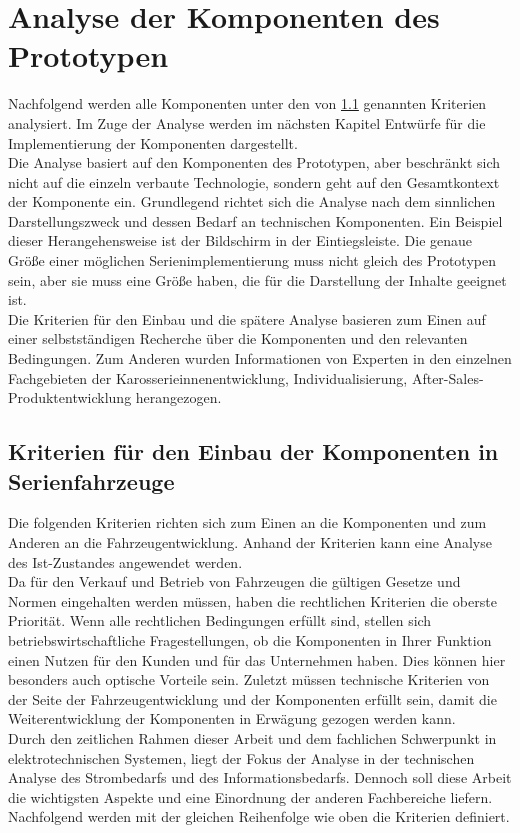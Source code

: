 \chapter{Analyse der Komponenten des Prototypen}
\label{cha:Analyse}
Nachfolgend werden alle Komponenten unter den von \ref{cha:Kriterien} genannten Kriterien analysiert. Im Zuge der Analyse werden im nächsten Kapitel Entwürfe für die Implementierung der Komponenten dargestellt.\\
Die Analyse basiert auf den Komponenten des Prototypen, aber beschränkt sich nicht auf die einzeln verbaute Technologie, sondern geht auf den Gesamtkontext der Komponente ein. Grundlegend richtet sich die Analyse nach dem sinnlichen Darstellungszweck und dessen Bedarf an technischen Komponenten. Ein Beispiel dieser Herangehensweise ist der Bildschirm in der Eintiegsleiste. Die genaue Größe einer möglichen Serienimplementierung muss nicht gleich des Prototypen sein, aber sie muss eine Größe haben, die für die Darstellung der Inhalte geeignet ist.\\
Die Kriterien für den Einbau und die spätere Analyse basieren zum Einen auf einer selbstständigen Recherche über die Komponenten und den relevanten Bedingungen. Zum Anderen wurden Informationen von Experten in den einzelnen Fachgebieten der Karosserieinnenentwicklung, Individualisierung, After-Sales-Produktentwicklung herangezogen.
\section{Kriterien für den Einbau der Komponenten in Serienfahrzeuge}
\label{cha:Kriterien}
Die folgenden Kriterien richten sich zum Einen an die Komponenten und zum Anderen an die Fahrzeugentwicklung. Anhand der Kriterien kann eine Analyse des Ist-Zustandes angewendet werden.\\
Da für den Verkauf und Betrieb von Fahrzeugen die gültigen Gesetze und Normen eingehalten werden müssen, haben die rechtlichen Kriterien die oberste Priorität. Wenn alle rechtlichen Bedingungen erfüllt sind, stellen sich betriebswirtschaftliche Fragestellungen, ob die Komponenten in Ihrer Funktion einen Nutzen für den Kunden und für das Unternehmen haben. Dies können hier besonders auch optische Vorteile sein. Zuletzt müssen technische Kriterien von der Seite der Fahrzeugentwicklung und der Komponenten erfüllt sein, damit die Weiterentwicklung der Komponenten in Erwägung gezogen werden kann. \\
Durch den zeitlichen Rahmen dieser Arbeit und dem fachlichen Schwerpunkt in elektrotechnischen Systemen, liegt der Fokus der Analyse in der technischen Analyse des Strombedarfs und des Informationsbedarfs. Dennoch soll diese Arbeit die wichtigsten Aspekte und eine Einordnung der anderen Fachbereiche liefern.\\
Nachfolgend werden mit der gleichen Reihenfolge wie oben die Kriterien definiert.
